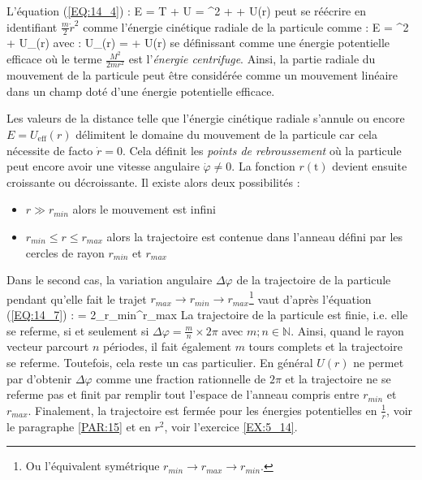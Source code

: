 L'\'equation (\ref{EQ:14_4}) :
\be
	E = T + U = ^{2} +  + U(r)
\ee
peut se r\'e\'ecrire en identifiant $\frac{m}{2}\dot{r}^{2}$ comme l'\'energie cin\'etique radiale de la particule comme :
\be
	E = ^{2} + U_{}(r)
\ee
avec :
\be
	U_{}(r) =  + U(r) \label{EQ:14_8}
\ee
se d\'efinissant comme une \'energie potentielle efficace o\`u le terme $\frac{M^{2}}{2mr^{2}}$ est l'\emph{\'energie centrifuge}. Ainsi, la partie radiale du mouvement de la particule peut \^etre consid\'er\'ee comme un mouvement lin\'eaire dans un champ dot\'e d'une \'energie potentielle efficace.

Les valeurs de la distance telle que l'\'energie cin\'etique radiale s'annule ou encore $E = U_{\mathrm{eff}}(r)$ d\'elimitent le domaine du mouvement de la particule car cela n\'ecessite de facto $\dot{r} = 0$. Cela d\'efinit les \emph{points de rebroussement} o\`u la particule peut encore avoir une vitesse angulaire $\dot{\varphi}\neq 0$. La fonction $r(\mathrm{t})$ devient ensuite croissante ou d\'ecroissante. Il existe alors deux possibilit\'es :
\begin{itemize}
	\item $r \gg r_{min}$ alors le mouvement est infini
	\item $r_{min} \leqslant r \leqslant r_{max}$ alors la trajectoire est contenue dans l'anneau d\'efini par les cercles de rayon $r_{min}$ et $r_{max}$
\end{itemize}
Dans le second cas, la variation angulaire $\Delta\varphi$ de la trajectoire de la particule pendant qu'elle fait le trajet $r_{max} \rightarrow r_{min} \rightarrow r_{max}$\footnote{Ou l'\'equivalent sym\'etrique $r_{min} \rightarrow r_{max} \rightarrow r_{min}$.} vaut d'apr\`es l'\'equation (\ref{EQ:14_7}) :
\be
	\Delta\varphi = 2\int_{r_{min}}^{r_{max}}{} \label{EQ:14_10}
\ee
La trajectoire de la particule est finie, i.e. elle se referme, si et seulement si $\Delta\varphi = \frac{m}{n}\times 2\pi$ avec ${m;n}\in\mathbb{N}$. Ainsi, quand le rayon vecteur parcourt $n$ p\'eriodes, il fait \'egalement $m$ tours complets et la trajectoire se referme. Toutefois, cela reste un cas particulier. En g\'en\'eral $U(r)$ ne permet par d'obtenir $\Delta\varphi$ comme une fraction rationnelle de $2\pi$ et la trajectoire ne se referme pas et finit par remplir tout l'espace de l'anneau compris entre $r_{min}$ et $r_{max}$. Finalement, la trajectoire est ferm\'ee pour les \'energies potentielles en $\frac{1}{r}$, voir le paragraphe \ref{PAR:15} et en $r^{2}$, voir l'exercice \ref{EX:5_14}.

